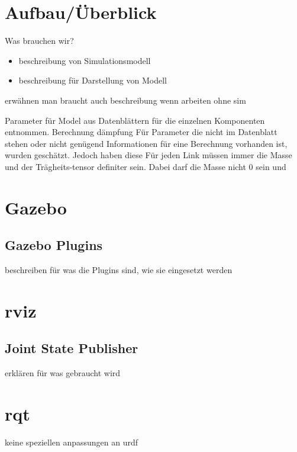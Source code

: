 \section{Aufbau/Überblick}
Was brauchen wir?
\begin{itemize}
\item beschreibung von Simulationsmodell
\item beschreibung für Darstellung von Modell
\end{itemize}
erwähnen man braucht auch beschreibung wenn arbeiten ohne sim

Parameter für Model aus Datenblättern für die einzelnen Komponenten entnommen. %
Berechnung dämpfung
Für Parameter die nicht im Datenblatt stehen oder nicht genügend Informationen für eine Berechnung vorhanden ist, wurden geschätzt.
Jedoch haben diese  
Für jeden Link müssen immer die Masse und der Trägheits-tensor definiter sein. Dabei darf die Masse nicht 0 sein und %

\section{Gazebo}
\subsection{Gazebo Plugins}
beschreiben für was die Plugins sind, wie sie eingesetzt werden


\section{rviz}
\subsection{Joint State Publisher}
erklären für was gebraucht wird

\section{rqt}
keine speziellen anpassungen an urdf 



